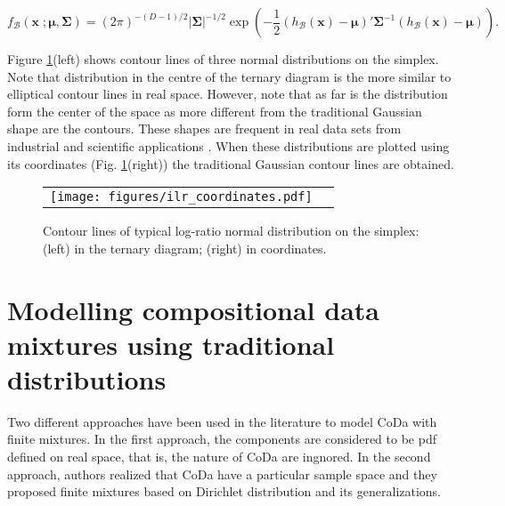 \documentclass[12pt, a4paper]{article}
\newcommand{\m}[1]{\boldsymbol{#1}}
\begin{document}
\begin{equation}\label{eq:densSNormal}
f_\mathcal{B}(\mathbf{x}\;; \m\mu, \m\Sigma) =(2\pi)^{-(D-1)/2} |\mathbf{\Sigma}|^{-1/2} \exp \left( -{\frac{1}{2}} \left(h_\mathcal{B}(\textbf{x})- \m\mu \right)' \mathbf{\Sigma}^{-1} \left( h_\mathcal{B}(\textbf{x})- \m\mu \right)\right).
\end{equation}

Figure \ref{fig01}(left) shows  contour lines of three normal distributions on the simplex. Note that distribution in the centre of the ternary diagram is the more similar to elliptical contour lines in real space. However, note that as far is
the distribution form the center of the space as more different from the traditional Gaussian shape are the contours. These shapes are frequent in real data sets from industrial and scientific applications \citep{buccianti2011natural,vives2014individual}.
When these distributions are plotted using its coordinates (Fig. \ref{fig01}(right)) the traditional Gaussian contour lines are obtained.


\begin{figure}[thbp]
\begin{center}
\begin{tabular}{cc}
  \texttt{[image: figures/ilr\_coordinates.pdf]} \\
 \end{tabular}
 \caption{Contour lines of typical log-ratio normal distribution on the simplex: (left) in the ternary diagram; (right) in coordinates. }\label{fig01}
\end{center}
\end{figure}



\section{Modelling compositional data mixtures using traditional distributions}
\label{standard_section}

\noindent Two different approaches have been used in the literature to model CoDa with finite mixtures. 
In the first approach,  the components are considered to be pdf defined on real space, that is, the nature of CoDa are ingnored. In the second approach,  authors realized that CoDa have a particular sample space and they proposed finite mixtures based on Dirichlet distribution and its generalizations.
\end{document}
